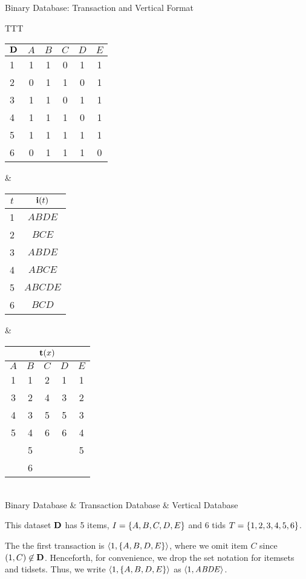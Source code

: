 \begin{frame}{Binary Database: Transaction and Vertical Format}
  
  \begin{tabular}{TTT}
	\small
      \begin{tabular}{|l||c|c|c|c|c|} \hline
        $\mathbf{D}$ & $A$ & $B$ & $C$ & $D$ & $E$\\ \hline
        1 & 1 & 1 & 0 & 1 & 1\\ \hline
    2 & 0 & 1 & 1 & 0 & 1\\ \hline
    3 & 1 & 1 & 0 & 1 & 1\\ \hline
    4 & 1 & 1 & 1 & 0 & 1\\ \hline
    5 & 1 & 1 & 1 & 1 & 1\\ \hline
    6 & 0 & 1 & 1 & 1 & 0\\ \hline
      \end{tabular}
  &
      \begin{tabular}{|c|c|} \hline
        $t$ & ${\mathbf{i}}(t)$\\ \hline
    1 & $\mathit{ABDE}$\\ \hline
    2 & $\mathit{BCE}$\\ \hline
    3 & $\mathit{ABDE}$\\ \hline
    4 & $\mathit{ABCE}$\\ \hline
    5 & $\mathit{ABCDE}$\\ \hline
    6 & $\mathit{BCD}$\\     \hline
      \end{tabular}
	&
      \begin{tabular}{|c|c|c|c|c|}
    \hline
	\multicolumn{5}{|c|}{${\mathbf{t}}(x)$}\\
	\hline
     $A$ & $B$ & $C$ & $D$ & $E$\\
    \hline
    1 & 1 & 2 & 1 & 1\\
    3 & 2 & 4 & 3 & 2\\
    4 & 3 & 5 & 5 & 3\\
    5 & 4 & 6 & 6 & 4\\
	& 5 &   &   & 5\\
     & 6 &   &   &  \\
    \hline
    \end{tabular}\\
	Binary Database & Transaction Database & Vertical Database
  \end{tabular}

  \bigskip
  This dataset $\mathbf{D}$ has 5 items, ${\relax I} = \{A,B,C,D,E\}$ and 6 tids
  ${\relax T} = \{1,2,3,4,5,6\}$. 
  
  \medskip
  The 
  the f\/{i}rst
transaction is $\langle 1, \{A,B,D,E\} \rangle$, where we omit item $C$ since
$(1,C) \not\in \mathbf{D}$.  Henceforth, for
convenience, we drop the set notation for itemsets and
tidsets. Thus, we write $\langle 1,
\{A,B,D,E\} \rangle$ as $\langle 1,\mathit{ABDE} \rangle$.
\end{frame}

